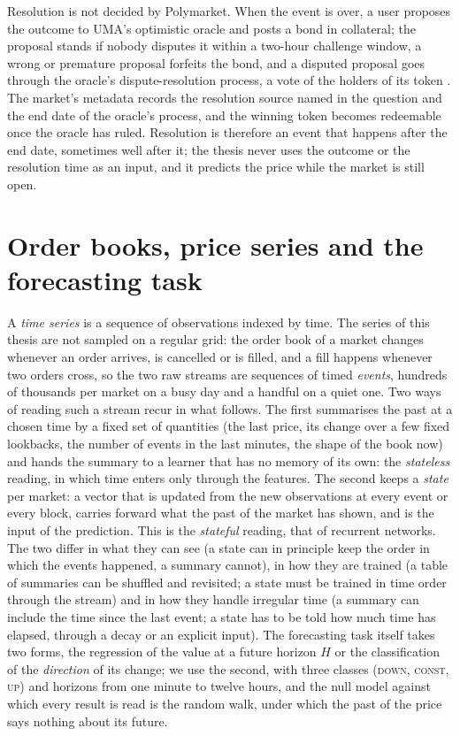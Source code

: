 Resolution is not decided by Polymarket.  When the event is over, a user proposes the outcome
to UMA's optimistic oracle and posts a bond in collateral; the proposal stands if nobody
disputes it within a two-hour challenge window, a wrong or premature proposal forfeits the
bond, and a disputed proposal goes through the oracle's dispute-resolution process, a vote of
the holders of its token \cite{polymarket2026resolution}.
The market's metadata records the resolution source named in the question and the end
date of the oracle's process, and the winning token becomes redeemable once the oracle has
ruled.  Resolution is therefore an event that happens after the end date, sometimes well
after it; the thesis never uses the outcome or the resolution time as an input, and it
predicts the price while the market is still open.

\section{Order books, price series and the forecasting task}
\label{sec:bg:ts}
\label{sec:bg:ts:concepts}

A \emph{time series} is a sequence of observations indexed by time.  The series of this
thesis are not sampled on a regular grid: the order book of a market changes whenever an
order arrives, is cancelled or is filled, and a fill happens whenever two orders cross, so
the two raw streams are sequences of timed \emph{events}, hundreds of thousands per market
on a busy day and a handful on a quiet one.  Two ways of reading such a stream recur in
what follows.  The first summarises the past at a chosen time by a fixed set of quantities
(the last price, its change over a few fixed lookbacks, the number of events in the last
minutes, the shape of the book now) and hands the summary to a learner that has no memory
of its own: the \emph{stateless} reading, in which time enters only through the features.
The second keeps a \emph{state} per market: a vector that is updated from the new
observations at every event or every block, carries forward what the past of the market has
shown, and is the input of the prediction.  This is the \emph{stateful} reading, that of
recurrent networks.  The two differ in what they can see (a state can in
principle keep the order in which the events happened, a summary cannot), in how they are
trained (a table of summaries can be shuffled and revisited; a state must be trained in
time order through the stream) and in how they handle irregular time (a summary can include
the time since the last event; a state has to be told how much time has elapsed, through a
decay or an explicit input).  The forecasting task itself takes two forms, the regression
of the value at a future horizon $H$ or the classification of the \emph{direction} of its
change; we use the second, with three classes (\textsc{down}, \textsc{const},
\textsc{up}) and horizons from one minute to twelve hours, and the null model against
which every result is read is the random walk, under which the past of the price says
nothing about its future.

